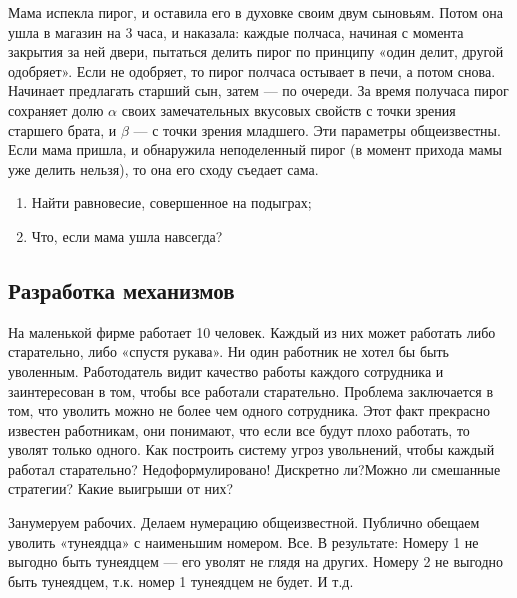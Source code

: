 \begin{problem}
\begin{source}
\cite{savva:nmu}
\end{source}
 Мама испекла пирог, и оставила его в духовке своим двум сыновьям. Потом она ушла в магазин на 3 часа, и наказала: каждые полчаса, начиная с момента закрытия за ней двери, пытаться делить пирог по принципу «один делит, другой одобряет». Если не одобряет, то пирог полчаса остывает в печи, а потом снова. Начинает предлагать старший сын, затем — по очереди. За время получаса пирог сохраняет долю $\alpha$ своих замечательных вкусовых свойств с точки зрения старшего брата, и $\beta$ — с точки зрения младшего. Эти параметры общеизвестны. Если мама пришла, и обнаружила неподеленный пирог (в момент прихода мамы уже делить нельзя), то она его сходу съедает сама.
\begin{enumerate}
\item Найти равновесие, совершенное на подыграх;
\item Что, если мама ушла навсегда?
\end{enumerate}






\begin{sol}

\end{sol}
\end{problem}


\subsection{Разработка механизмов}

\begin{problem}\par
\begin{source} \cite{miller:gtw} \end{source}
На маленькой фирме работает 10 человек. Каждый из них может работать либо старательно, либо «спустя рукава». Ни один работник не хотел бы быть уволенным. Работодатель видит качество работы каждого сотрудника и заинтересован в том, чтобы все работали старательно. Проблема заключается в том, что уволить можно не более чем одного сотрудника. Этот факт прекрасно известен работникам, они понимают, что если все будут плохо работать, то уволят только одного. Как построить систему угроз увольнений, чтобы каждый работал старательно?
{\red Недоформулировано! Дискретно ли?Можно ли смешанные стратегии? Какие выигрыши от них?}
\par




\begin{sol}
Занумеруем рабочих. Делаем нумерацию общеизвестной. Публично обещаем уволить «тунеядца» с наименьшим номером. Все. В результате: Номеру 1 не выгодно быть тунеядцем — его уволят не глядя на других. Номеру 2 не выгодно быть тунеядцем, т.к. номер 1 тунеядцем не будет. И т.д.
\end{sol}
\end{problem}



